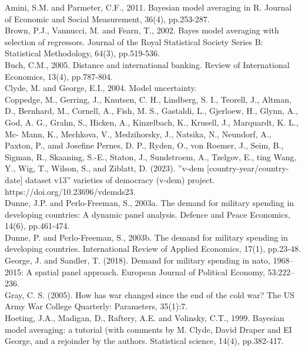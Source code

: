 \documentclass[12pt,a4paper]{article}
\begin{document}
Amini, S.M. and Parmeter, C.F., 2011. Bayesian model averaging in R. Journal of Economic and Social Measurement, 36(4), pp.253-287. \\

Brown, P.J., Vannucci, M. and Fearn, T., 2002. Bayes model averaging with selection of regressors. Journal of the Royal Statistical Society Series B: Statistical Methodology, 64(3), pp.519-536.\\

Buch, C.M., 2005. Distance and international banking. Review of International Economics, 13(4), pp.787-804. \\

Clyde, M. and George, E.I., 2004. Model uncertainty.\\

Coppedge, M., Gerring, J., Knutsen, C. H., Lindberg, S. I., Teorell, J., Altman, D., Bernhard, M., Cornell, A., Fish, M. S., Gastaldi, L., Gjerloew, H., Glynn, A., God, A. G., Grahn, S., Hicken, A., Kinzelbach, K., Krusell, J., Marquardt, K. L., Mc- Mann, K., Mechkova, V., Medzihorsky, J., Natsika, N., Neundorf, A., Paxton, P., amd Josefine Pernes, D. P., Ryden, O., von Roemer, J., Seim, B., Sigman, R., Skaaning, S.-E., Staton, J., Sundstroem, A., Tzelgov, E., ting Wang, Y., Wig, T., Wilson, S., and Ziblatt, D. (2023). ”v-dem [country-year/country-date] dataset v13” varieties of democracy (v-dem) project. https://doi.org/10.23696/vdemds23. \\

Dunne, J.P. and Perlo-Freeman, S., 2003a. The demand for military spending in developing countries: A dynamic panel analysis. Defence and Peace Economics, 14(6), pp.461-474.\\

Dunne, P. and Perlo-Freeman, S., 2003b. The demand for military spending in developing countries. International Review of Applied Economics, 17(1), pp.23-48. \\

George, J. and Sandler, T. (2018). Demand for military spending in nato, 1968–2015: A spatial panel approach. European Journal of Political Economy, 53:222–236. \\

Gray, C. S. (2005). How has war changed since the end of the cold war? The US Army War College Quarterly: Parameters, 35(1):7. \\

Hoeting, J.A., Madigan, D., Raftery, A.E. and Volinsky, C.T., 1999. Bayesian model averaging: a tutorial (with comments by M. Clyde, David Draper and EI George, and a rejoinder by the authors. Statistical science, 14(4), pp.382-417. \\
\end{document}

